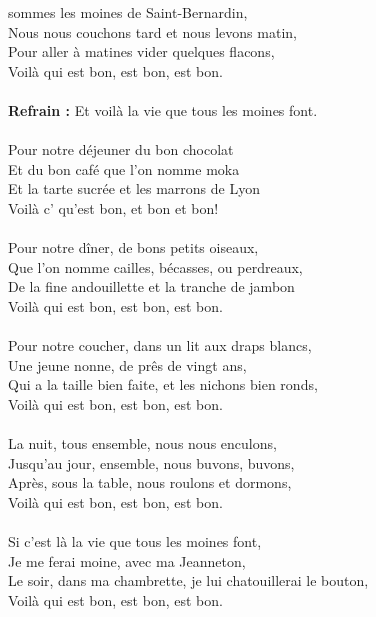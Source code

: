 %

 sommes les moines de Saint-Bernardin, \bissimple
\\Nous nous couchons tard et nous levons matin, \bissimple
\\Pour aller à matines vider quelques flacons,
\\Voilà qui est bon, est bon, est bon.
\\\\\textbf{Refrain :}
{Et voilà la vie que tous les moines font.}
\\\\Pour notre déjeuner du bon chocolat \bissimple
\\Et du bon café que l'on nomme moka \bissimple
\\Et la tarte sucrée et les marrons de Lyon
\\Voilà c' qu'est bon, et bon et bon!
\\\\Pour notre dîner, de bons petits oiseaux, \bissimple
\\Que l'on nomme cailles, bécasses, ou perdreaux, \bissimple
\\De la fine andouillette et la tranche de jambon
\\Voilà qui est bon, est bon, est bon.
\\\\Pour notre coucher, dans un lit aux draps blancs, \bissimple
\\Une jeune nonne, de prês de vingt ans, \bissimple
\\Qui a la taille bien faite, et les nichons bien ronds,
\\Voilà qui est bon, est bon, est bon.
\\\\La nuit, tous ensemble, nous nous enculons, \bissimple
\\Jusqu'au jour, ensemble, nous buvons, buvons,\bissimple
\\Après, sous la table, nous roulons et dormons,
\\Voilà qui est bon, est bon, est bon.
\\\\Si c'est là la vie que tous les moines font, \bissimple
\\Je me ferai moine, avec ma Jeanneton,\bissimple
\\Le soir, dans ma chambrette, je lui chatouillerai le bouton,
\\Voilà qui est bon, est bon, est bon.

\breakpage